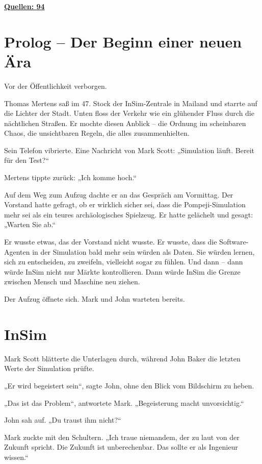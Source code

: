 \documentclass[
]{article}
\begin{document}
\hyperref[quellen]{\textbf{Quellen: 94}}

\section{Prolog -- Der Beginn einer neuen Ära}\label{prolog-der-beginn-einer-neuen-uxe4ra}

Vor der Öffentlichkeit verborgen.

Thomas Mertens saß im 47. Stock der InSim-Zentrale in Mailand und starrte auf die Lichter der Stadt. Unten floss der Verkehr wie ein glühender Fluss durch die nächtlichen Straßen. Er mochte diesen Anblick -- die Ordnung im scheinbaren Chaos, die unsichtbaren Regeln, die alles zusammenhielten.

Sein Telefon vibrierte. Eine Nachricht von Mark Scott: „Simulation läuft. Bereit für den Test?{\kern0pt}``

Mertens tippte zurück: „Ich komme hoch.``

Auf dem Weg zum Aufzug dachte er an das Gespräch am Vormittag. Der Vorstand hatte gefragt, ob er wirklich sicher sei, dass die Pompeji-Simulation mehr sei als ein teures archäologisches Spielzeug. Er hatte gelächelt und gesagt: „Warten Sie ab.``

Er wusste etwas, das der Vorstand nicht wusste. Er wusste, dass die Software-Agenten in der Simulation bald mehr sein würden als Daten. Sie würden lernen, sich zu entscheiden, zu zweifeln, vielleicht sogar zu fühlen. Und dann -- dann würde InSim nicht nur Märkte kontrollieren. Dann würde InSim die Grenze zwischen Mensch und Maschine neu ziehen.

Der Aufzug öffnete sich. Mark und John warteten bereits.

\section{InSim}\label{insim}

Mark Scott blätterte die Unterlagen durch, während John Baker die letzten Werte der Simulation prüfte.

„Er wird begeistert sein``, sagte John, ohne den Blick vom Bildschirm zu heben.

„Das ist das Problem``, antwortete Mark. „Begeisterung macht unvorsichtig.``

John sah auf. „Du traust ihm nicht?{\kern0pt}``

Mark zuckte mit den Schultern. „Ich traue niemandem, der zu laut von der Zukunft spricht. Die Zukunft ist unberechenbar. Das sollte er als Ingenieur wissen.``
\end{document}
